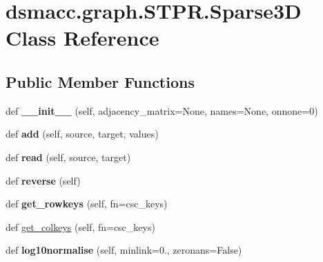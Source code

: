 \hypertarget{classdsmacc_1_1graph_1_1STPR_1_1Sparse3D}{}\section{dsmacc.\+graph.\+S\+T\+P\+R.\+Sparse3D Class Reference}
\label{classdsmacc_1_1graph_1_1STPR_1_1Sparse3D}
\subsection*{Public Member Functions}
\begin{DoxyCompactItemize}
\item 
\mbox{\label{classdsmacc_1_1graph_1_1STPR_1_1Sparse3D_a9406cf189689ec26cbb75194384b12c8}} 
def {\bfseries \+\_\+\+\_\+init\+\_\+\+\_\+} (self, adjacency\+\_\+matrix=None, names=None, onnone=0)
\item 
\mbox{\label{classdsmacc_1_1graph_1_1STPR_1_1Sparse3D_aae48ed1240e8ead19cd54ad7b3d9c2b9}} 
def {\bfseries add} (self, source, target, values)
\item 
\mbox{\label{classdsmacc_1_1graph_1_1STPR_1_1Sparse3D_a0d37abdccbeaa010dcfc5906144fbf89}} 
def {\bfseries read} (self, source, target)
\item 
\mbox{\label{classdsmacc_1_1graph_1_1STPR_1_1Sparse3D_a1d3d63de1433c90e5d388de7b6e898a7}} 
def {\bfseries reverse} (self)
\item 
\mbox{\label{classdsmacc_1_1graph_1_1STPR_1_1Sparse3D_adf344ccb45dbb3f75257db7dd9779ecb}} 
def {\bfseries get\+\_\+rowkeys} (self, fn=\textquotesingle{}csc\+\_\+keys\textquotesingle{})
\item 
def \mbox{\hyperlink{classdsmacc_1_1graph_1_1STPR_1_1Sparse3D_ac87c5e48b0a4b67709a9249423398660}{get\+\_\+colkeys}} (self, fn=\textquotesingle{}csc\+\_\+keys\textquotesingle{})
\item 
\mbox{\label{classdsmacc_1_1graph_1_1STPR_1_1Sparse3D_ad2a3ee6ba6c7a650c98100dbc1e4a19f}} 
def {\bfseries log10normalise} (self, minlink=0., zeronans=False)

\end{DoxyCompactItemize}
